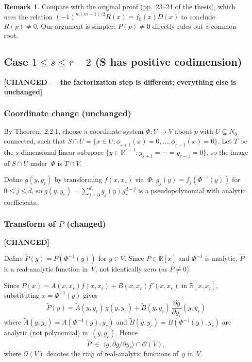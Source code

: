 \documentclass[11pt]{article}
\theoremstyle{plain}
\theoremstyle{definition}
\newtheorem*{remark}{Remark}
\newcommand{\R}{\mathbb{R}}
\begin{document}
\begin{remark}
Compare with the original proof (pp.~23--24 of the thesis), which uses
the relation $(-1)^{m(m-1)/2} R(x) = f_0(x) D(x)$ to conclude
$R(p) \ne 0$.  Our argument is simpler: $P(p) \ne 0$ directly rules out
a common root.
\end{remark}

\subsection{Case \texorpdfstring{$1 \le s \le r - 2$}{1 <= s <= r - 2}
  (S has positive codimension)}
\label{ssec:case_codim}

\textbf{[CHANGED --- the factorization step is different; everything
  else is unchanged]}

\subsubsection{Coordinate change (unchanged)}
\label{sssec:coord_change}

By Theorem~2.2.1, choose a coordinate system $\Phi : U \to V$ about $p$
with $U \subseteq N_0$ connected, such that
$S \cap U = \{ x \in U : \phi_{s+1}(x) = 0, \ldots, \phi_{r-1}(x) = 0 \}$.
Let $T$ be the $s$-dimensional linear subspace
$\{ y \in \R^{r-1} : y_{s+1} = \cdots = y_{r-1} = 0 \}$, so the image of
$S \cap U$ under~$\Phi$ is $T \cap V$.

Define $g(y, y_r)$ by transforming $f(x, x_r)$ via~$\Phi$:
$g_j(y) = f_j(\Phi^{-1}(y))$ for $0 \le j \le d$, so
$g(y, y_r) = \sum_{j=0}^{d} g_j(y) y_r^{d-j}$ is a pseudopolynomial
with analytic coefficients.

\subsubsection{Transform of \texorpdfstring{$P$}{P} (changed)}
\label{sssec:transform_P}

\textbf{[CHANGED]}

Define $\widetilde{P}(y) = P(\Phi^{-1}(y))$ for $y \in V$.  Since
$P \in \R[x]$ and $\Phi^{-1}$ is analytic, $\widetilde{P}$ is a
real-analytic function in~$V$, not identically zero (as $P \ne 0$).

Since $P(x) = A(x, x_r) f(x, x_r) + B(x, x_r) f'(x, x_r)$ in
$\R[x, x_r]$, substituting $x = \Phi^{-1}(y)$ gives
\[
  \widetilde{P}(y) = \widetilde{A}(y, y_r) \, g(y, y_r)
    + \widetilde{B}(y, y_r) \, \frac{\partial g}{\partial y_r}(y, y_r)
\]
where $\widetilde{A}(y, y_r) = A(\Phi^{-1}(y), y_r)$ and
$\widetilde{B}(y, y_r) = B(\Phi^{-1}(y), y_r)$ are analytic (not
polynomial) in~$(y, y_r)$.  Hence
\[
  \widetilde{P} \;\in\;
    \langle g, \partial g / \partial y_r \rangle \cap \mathcal{O}(V),
\]
where $\mathcal{O}(V)$ denotes the ring of real-analytic functions of~$y$
in~$V$.
\end{document}
